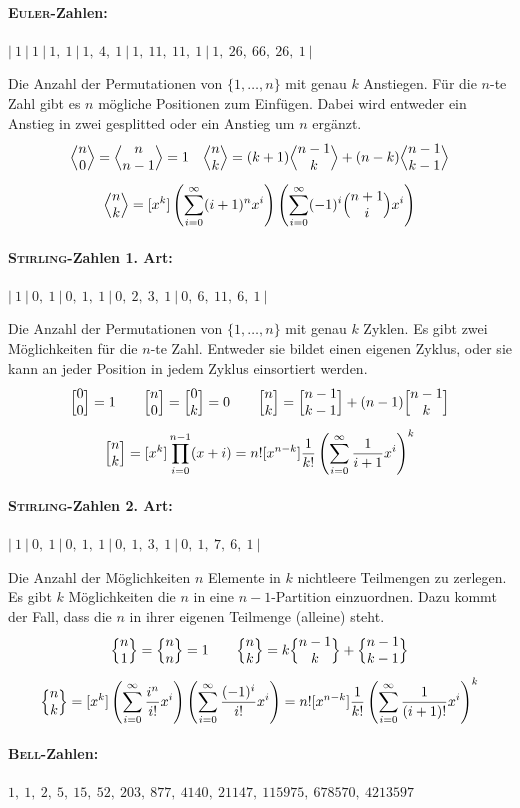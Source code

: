 \paragraph{\textsc{Euler}-Zahlen:}
$|~1~|~1~|~1,~1~|~1,~4,~1~|~1,~11,~11,~1~|~1,~26,~66,~26,~1~|$

Die Anzahl der Permutationen von $\{1, \ldots, n\}$ mit genau $k$ Anstiegen.
Für die $n$-te Zahl gibt es $n$ mögliche Positionen zum Einfügen.
Dabei wird entweder ein Anstieg in zwei gesplitted oder ein Anstieg um $n$ ergänzt.
\[\Bigl\langle \begin{matrix} n \\ 0 \end{matrix} \Bigr\rangle = \Bigl\langle \begin{matrix} n \\ n-1 \end{matrix} \Bigr\rangle = 1 \quad
\Bigl\langle \begin{matrix} n \\ k \end{matrix} \Bigr\rangle = (k+1) \Bigl\langle \begin{matrix} n-1 \\ k \end{matrix} \Bigr\rangle + (n-k) \Bigl\langle \begin{matrix} n-1 \\ k-1 \end{matrix} \Bigr\rangle\]
\[
\Bigl\langle \begin{matrix} n \\ k \end{matrix} \Bigr\rangle = [x^k]
	\left(\sum_{i=0}^\infty (i+1)^n x^i\right)
	\left(\sum_{i=0}^\infty (-1)^i \Bigl( \begin{matrix} n+1 \\ i \end{matrix} \Bigr) x^i\right)
\]

\paragraph{\textsc{Stirling}-Zahlen 1. Art:}
$|~1~|~0,~1~|~0,~1,~1~|~0,~2,~3,~1~|~0,~6,~11,~6,~1~|$

Die Anzahl der Permutationen von $\{1, \ldots, n\}$ mit genau $k$ Zyklen.
Es gibt zwei Möglichkeiten für die $n$-te Zahl. Entweder sie bildet einen eigenen Zyklus, oder sie kann an jeder Position in jedem Zyklus einsortiert werden.
\[\Bigl[ \begin{matrix} 0 \\ 0 \end{matrix} \Bigr] = 1 \qquad
\Bigl[ \begin{matrix} n \\ 0 \end{matrix} \Bigr] = \Bigl[ \begin{matrix} 0 \\ k \end{matrix} \Bigr] = 0 \qquad
\Bigl[ \begin{matrix} n \\ k \end{matrix} \Bigr] = \Bigl[ \begin{matrix} n-1 \\ k-1 \end{matrix} \Bigr] + (n-1) \Bigl[ \begin{matrix} n-1 \\ k \end{matrix} \Bigr]\]
\[
\Bigl[ \begin{matrix} n \\ k \end{matrix} \Bigr]
= [x^k]\prod_{i=0}^{n-1} (x+i)
= n! [x^{n-k}] \frac{1}{k!} \left(\sum_{i=0}^\infty \frac{1}{i+1}x^i\right)^k
\]

\paragraph{\textsc{Stirling}-Zahlen 2. Art:}
$|~1~|~0,~1~|~0,~1,~1~|~0,~1,~3,~1~|~0,~1,~7,~6,~1~|$

Die Anzahl der Möglichkeiten $n$ Elemente in $k$ nichtleere Teilmengen zu zerlegen.
Es gibt $k$ Möglichkeiten die $n$ in eine $n-1$-Partition einzuordnen.
Dazu kommt der Fall, dass die $n$ in ihrer eigenen Teilmenge (alleine) steht.
\[\Bigl\{ \begin{matrix} n \\ 1 \end{matrix} \Bigr\} = \Bigl\{ \begin{matrix} n \\ n \end{matrix} \Bigr\} = 1 \qquad
\Bigl\{ \begin{matrix} n \\ k \end{matrix} \Bigr\} = k \Bigl\{ \begin{matrix} n-1 \\ k \end{matrix} \Bigr\} + \Bigl\{ \begin{matrix} n-1 \\ k-1 \end{matrix} \Bigr\}
\]
\[
\Bigl\{ \begin{matrix} n \\ k \end{matrix} \Bigr\}
= [x^k]
	\left(\sum_{i=0}^\infty \frac{i^n}{i!}x^i\right)
	\left(\sum_{i=0}^\infty \frac{(-1)^i}{i!}x^i\right)
= n! [x^{n-k}] \frac{1}{k!} \left(\sum_{i=0}^\infty \frac{1}{(i+1)!}x^i\right)^k
\]

\paragraph{\textsc{Bell}-Zahlen:}
$1,~1,~2,~5,~15,~52,~203,~877,~4140,~21147,~115975,~678570,~4213597$

